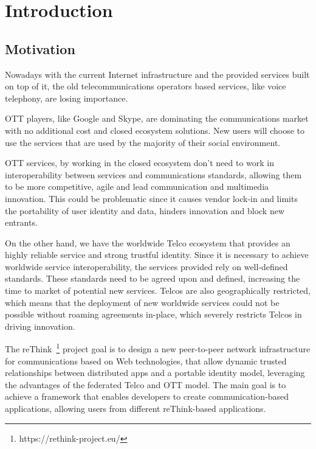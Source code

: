 \chapter{Introduction}
\label{chapter:introduction}

\section{Motivation}
\label{section:motivation}

Nowadays with the current Internet infrastructure and the provided services built on top of it, the old telecommunications operators based services, like voice telephony, are losing importance.

\ac{OTT} players, like Google and Skype, are dominating the communications market with no additional cost and closed ecosystem solutions.
New users will choose to use the services that are used by the majority of their social environment.

\ac{OTT} services, by working in the closed ecosystem don't need to work in interoperability between services and communications standards, allowing them to be more competitive, agile and lead communication and multimedia innovation.
This could be problematic since it causes vendor lock-in and limits the portability of user identity and data, hinders innovation and block new entrants.

On the other hand, we have the worldwide Telco ecosystem that provides an highly reliable service and strong trustful identity.
Since it is necessary to achieve worldwide service interoperability, the services provided rely on well-defined standards. These standards need to be agreed upon and defined, increasing the time to market of potential new services.
Telcos are also geographically restricted, which means that the deployment of new worldwide services could not be possible without roaming agreements in-place, which severely restricts Telcos in driving innovation.

The reThink~\footnote{https://rethink-project.eu/} project goal is to design a new peer-to-peer network infrastructure for communications based on Web technologies, that allow dynamic trusted relationships between distributed apps and a portable identity model, leveraging the advantages of the federated Telco and \ac{OTT} model.
The main goal is to achieve a framework that enables developers to create communication-based applications, allowing users from different reThink-based applications.

